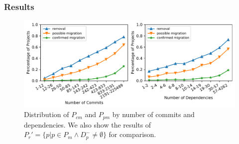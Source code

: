 \documentclass[sigconf, screen]{acmart}
\begin{document}
\subsubsection{Results}

\begin{figure}[t]
  \centering
  \includegraphics[width=\linewidth]{fig/migrel.pdf}
\vspace{-7mm}
  \caption{Distribution of $P_{cm}$ and $P_{pm}$ by number of commits and dependencies. We also show the results of $P_r'=\{p|p\in P_m \land D_p^- \ne \emptyset\}$ for comparison.}
  \label{fig:migrel}
\vspace{-4mm}
\end{figure}
\end{document}
